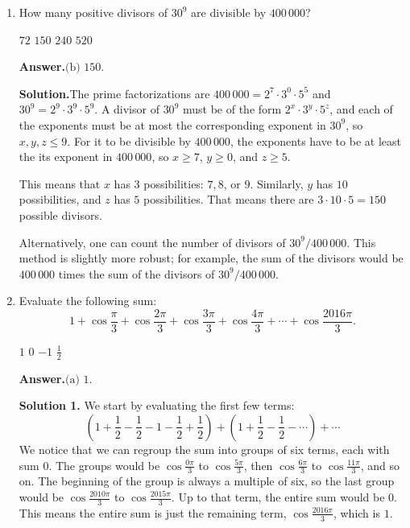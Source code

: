 \documentclass[11pt,paper=letter]{scrartcl}
\newcommand{\ans}{{\sffamily \bfseries Answer.}\;}
\newcommand{\ansb}[2]{\ans\(\boxed{\text{(#1) #2}}\).}
\newcommand{\sol}{{\sffamily \bfseries Solution.}\;}
\newcommand{\soln}[1]{{\sffamily \bfseries Solution #1.}\;}
\newenvironment{rem}%
{\noindent \ignorespaces \small \sffamily \sansmath {\bfseries Remark.}}%
{\ignorespacesafterend}
\begin{document}
\begin{enumerate}[left=0pt]
\item How many positive divisors of $30^9$ are divisible by $400\,000$?

\fourch
{$72$}
{$150$}
{$240$}
{$520$}

\ansb{b}{$150$}

\sol The prime factorizations are $400\,000 = 2^7 \cdot 3^0 \cdot 5^5$ and $30^9 = 2^9 \cdot 3^9 \cdot 5^9$. A divisor of $30^9$ must be of the form $2^x \cdot 3^y \cdot 5^z$, and each of the exponents must be at most the corresponding exponent in $30^9$, so $x, y, z \le 9$. For it to be divisible by $400\,000$, the exponents have to be at least the its exponent in $400\,000$, so $x \ge 7$, $y \ge 0$, and $z \ge 5$.

This means that $x$ has $3$ possibilities: $7, 8$, or $9$. Similarly, $y$ has $10$ possibilities, and $z$ has $5$ possibilities. That means there are $3 \cdot 10 \cdot 5 = 150$ possible divisors.

\begin{rem}
Alternatively, one can count the number of divisors of $30^9 / 400\,000$. This method is slightly more robust; for example, the sum of the divisors would be $400\,000$ times the sum of the divisors of $30^9 / 400\,000$.
\end{rem}

\item Evaluate the following sum: \[
  1 + \cos \frac{\pi}{3} + \cos \frac{2\pi}{3} + \cos \frac{3\pi}{3} + \cos \frac{4\pi}{3} + \cdots + \cos \frac{2016\pi}{3}.
\]

\fourch
{$1$}
{$0$}
{$-1$}
{$\frac{1}{2}$}

\ansb{a}{$1$}

\soln1 We start by evaluating the first few terms: \[
  \left(1 + \frac{1}{2} - \frac{1}{2} - 1 - \frac{1}{2} + \frac{1}{2}\right) + \left(1 + \frac{1}{2} - \frac{1}{2} - \cdots\right) + \cdots
\]
We notice that we can regroup the sum into groups of six terms, each with sum $0$. The groups would be $\cos \frac{0\pi}{3}$ to $\cos \frac{5\pi}{3}$, then $\cos \frac{6\pi}{3}$ to $\cos \frac{11\pi}{3}$, and so on. The beginning of the group is always a multiple of six, so the last group would be $\cos \frac{2010\pi}{3}$ to $\cos \frac{2015\pi}{3}$. Up to that term, the entire sum would be $0$. This means the entire sum is just the remaining term, $\cos \frac{2016\pi}{3}$, which is $1$.


\end{enumerate}
\end{document}
